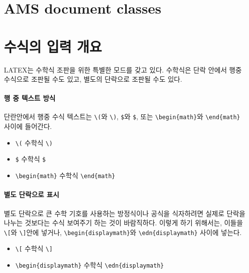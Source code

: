\documentclass[12pt,a4paper]{report}
\begin{document}
\newpage
\section{AMS document classes}






%
%
%
\newpage
\section{수식의 입력 개요}

	LATEX는 수학식 조판을 위한 특별한 모드를 갖고 있다.
	수학식은 단락 안에서 행중 수식으로 조판될 수도 있고, 별도의 단락으로 조판될 수도 있다.

	\paragraph{행 중 텍스트 방식}
	단란안에서 행중 수식 텍스트는 \verb|\(|와 \verb|\)|, \verb|$|와 \verb|$|, 또는 
	\verb|\begin{math}|와 \verb|\end{math}| 사이에 들어간다.

	\begin{itemize}
	\item 	\verb|\(| 수학식 \verb|\)|
	\item 	\verb|$| 수학식 \verb|$|
	\item 	\verb|\begin{math}| 수학식 \verb|\end{math}|
	\end{itemize}


	\paragraph{별도 단락으로 표시}
	별도 단락으로 큰 수학 기호를 사용하는 방정식이나 공식을 식자하려면
	실제로 단락을 나누는 것보다는 수식 보여주기 하는 것이 바람직하다.
	이렇게 하기 위해서는, 이들을 \verb|\[|와 \verb|\]|안에 넣거나, 
	\verb|\begin{displaymath}|와 \verb|\edn{displaymath}| 사이에 넣는다.

	\begin{itemize}
	\item 	\verb|\[| 수학식 \verb|\]|
	\item 	\verb|\begin{displaymath}| 수학식 \verb|\edn{displaymath}|
	\end{itemize}
\end{document}
